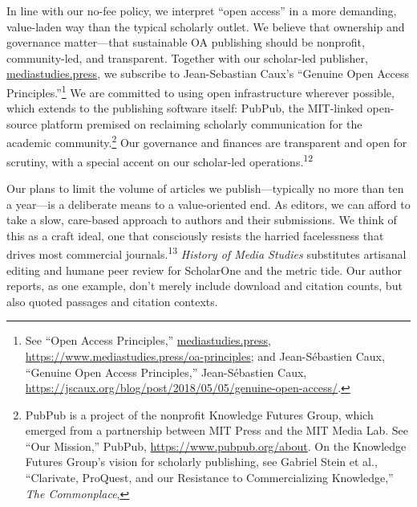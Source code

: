 \documentclass{tufte-handout}
\begin{document}
In line with our no-fee policy, we interpret ``open access'' in a more
demanding, value-laden way than the typical scholarly outlet. We believe
that ownership and governance matter---that sustainable OA publishing
should be nonprofit, community-led, and transparent. Together with our
scholar-led publisher,
\href{https://mediastudies.press}{mediastudies.press}, we subscribe to
Jean-Sebastian Caux's ``Genuine Open Access
Principles.''\footnote{See ``Open Access Principles,''
  \href{http://mediastudies.press}{mediastudies.press},
  \url{https://www.mediastudies.press/oa-principles}; and Jean-Sébastien
  Caux, ``Genuine Open Access Principles,'' Jean-Sébastien Caux,
  \url{https://jscaux.org/blog/post/2018/05/05/genuine-open-access/}.
} We are committed to
using open infrastructure wherever possible, which extends to the
publishing software itself: PubPub, the MIT-linked open-source platform
premised on reclaiming scholarly communication for the academic
community.\footnote{PubPub is a project of the nonprofit Knowledge Futures Group, which
  emerged from a partnership between MIT Press and the MIT Media Lab.
  See ``Our Mission,'' PubPub, \url{https://www.pubpub.org/about}. On
  the Knowledge Futures Group's vision for scholarly publishing, see
  Gabriel Stein et al., ``Clarivate, ProQuest, and our Resistance to
  Commercializing Knowledge,'' \emph{The Commonplace},
} Our governance and
finances are transparent and open for scrutiny, with a special accent on
our scholar-led operations.\textsuperscript{12}

Our plans to limit the volume of articles we publish---typically no more
than ten a year---is a deliberate means to a value-oriented end. As
editors, we can afford to take a slow, care-based approach to authors
and their submissions. We think of this as a craft ideal, one that
consciously resists the harried facelessness that drives most commercial
journals.\textsuperscript{13} \emph{History of Media
Studies} substitutes artisanal editing and humane peer review for
ScholarOne and the metric tide. Our author 
 reports, as one example,
don't merely include download and citation counts, but also quoted
passages and citation contexts.
\end{document}
